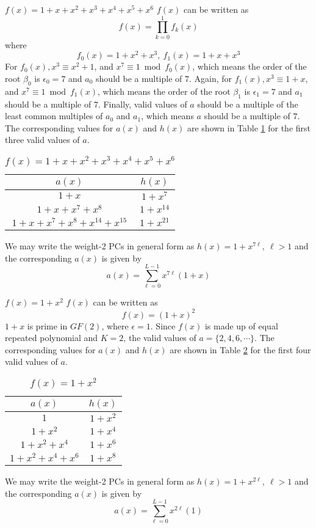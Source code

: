 \begin{example}
$f(x)=1+x+x^2+x^3+x^4+x^5+x^6$\newline
$f(x)$ can be written as 
$$f(x)=\prod_{k=0}^{1}f_k(x)$$
where 
$$f_0(x)=1+x^2+x^3,~f_1(x)=1+x+x^3$$ 
For $f_0(x), x^3 \equiv x^2+1$, and $x^7 \equiv 1 \bmod f_0(x)$, which means the order of the root $\beta_0$ is $\epsilon_0=7$ and $a_0$ should be a multiple of $7$. Again, for  $f_1(x), x^3 \equiv 1+x$, and $x^7 \equiv 1 \bmod f_1(x)$, which means the order of the root $\beta_1$ is $\epsilon_1=7$ and $a_1$ should be a multiple of $7$.
Finally, valid values of $a$ should be a multiple of the least common multiples of $a_0$ and $a_1$, which means $a$ should be a multiple of $7$.
The corresponding values for $a(x)$ and $h(x)$ are shown in Table \ref{novelTab1-b} for the first three valid values of $a$.
\begin{table}[htbp]
\renewcommand{\arraystretch}{1.3}
 \caption{$f(x)=1+x+x^2+x^3+x^4+x^5+x^6$}
 \centering
\begin{tabular}{c c } 
\hline
 $a(x)$ & $h(x)$ \\ [0.5ex] 
\hline\hline
$1+x$ & $1+x^7$\\ 
$1+x+x^7+x^8$ & $1+x^{14}$ \\
$1+x+x^7+x^8+x^{14}+x^{15}$ & $1+x^{21}$
\end{tabular}
 \label{novelTab1-b}
\end{table}

We may write the weight-2 PCs in general form as $h(x)=1+x^{7\ell},~\ell>1$ and the corresponding $a(x)$ is given by 
\begin{equation*}
a(x)=\sum_{\ell=0}^{L-1} x^{7\ell}(1+x)
\end{equation*}
\end{example}

\begin{example}
$f(x)=1+x^2$\newline
$f(x)$ can be written as $$f(x)=(1+x)^2$$ $1+x$ is prime in $GF(2)$, where $\epsilon =1$. Since $f(x)$ is made up of equal repeated polynomial and $K=2$, the valid values of $a=\{2,4,6,\cdots \}$.
The corresponding values for $a(x)$ and $h(x)$ are shown in Table \ref{novelTab1} for the first four valid values of $a$.
\begin{table}[htbp]
\renewcommand{\arraystretch}{1.3}
 \caption{$f(x)=1+x^2$}
 \centering
\begin{tabular}{c c } 
\hline
 $a(x)$ & $h(x)$ \\ [0.5ex] 
\hline\hline
$1$ & $1+x^2$\\ 
$1+x^2$ & $1+x^4$ \\
$1+x^2+x^4$ & $1+x^6$\\
$1+x^2+x^4+x^6$ & $1+x^8$ 
\end{tabular}
 \label{novelTab1}
\end{table}

We may write the weight-2 PCs in general form as $h(x)=1+x^{2\ell},~\ell>1$ and the corresponding $a(x)$ is given by 
\begin{equation*}
a(x)=\sum_{\ell=0}^{L-1} x^{2\ell}(1)
\end{equation*}
\end{example}

